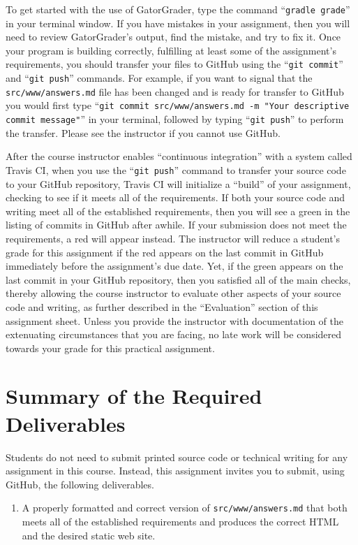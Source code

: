 \documentclass[11pt]{article}
\newcommand{\mainprogramsource}{\lstinline{src/www/answers.md}}
\newcommand{\gatorgraderstart}{\command{gradle grade}}
\newcommand{\gitcommit}{\command{git commit}}
\newcommand{\gitpush}{\command{git push}}
\newcommand{\gitcommitmainprogram}{\command{git commit src/www/answers.md -m "Your
descriptive commit message"}}
\newcommand{\command}[1]{``\lstinline{#1}''}
\newcommand{\step}[1]{``{#1}''}
\newcommand{\checkmark}{\ding{51}}
\newcommand{\naughtmark}{\ding{55}}
\begin{document}
To get started with the use of GatorGrader, type the command
\gatorgraderstart{} in your terminal window. If you have mistakes in your
assignment, then you will need to review GatorGrader's output, find the
mistake, and try to fix it. Once your program is building correctly, fulfilling
at least some of the assignment's requirements, you should transfer your files
to GitHub using the \gitcommit{} and \gitpush{} commands. For example, if you
want to signal that the \mainprogramsource{} file has been changed and is ready
for transfer to GitHub you would first type \gitcommitmainprogram{} in your
terminal, followed by typing \gitpush{} to perform the transfer. Please see the
instructor if you cannot use GitHub.

After the course instructor enables \step{continuous integration} with a system
called Travis CI, when you use the \gitpush{} command to transfer your source
code to your GitHub repository, Travis CI will initialize a \step{build} of your
assignment, checking to see if it meets all of the requirements. If both your
source code and writing meet all of the established requirements, then you will
see a green \checkmark{} in the listing of commits in GitHub after awhile. If
your submission does not meet the requirements, a red \naughtmark{} will appear
instead. The instructor will reduce a student's grade for this assignment if the
red \naughtmark{} appears on the last commit in GitHub immediately before the
assignment's due date. Yet, if the green \checkmark{} appears on the last commit
in your GitHub repository, then you satisfied all of the main checks, thereby
allowing the course instructor to evaluate other aspects of your source code and
writing, as further described in the \step{Evaluation} section of this
assignment sheet. Unless you provide the instructor with documentation of the
extenuating circumstances that you are facing, no late work will be considered
towards your grade for this practical assignment.

\section*{Summary of the Required Deliverables}

\noindent Students do not need to submit printed source code or technical
writing for any assignment in this course. Instead, this assignment invites you
to submit, using GitHub, the following deliverables.

\begin{enumerate}

\setlength{\itemsep}{0in}

\item A properly formatted and correct version of \mainprogramsource{} that both
  meets all of the established requirements and produces the correct HTML and
  the desired static web site.

\end{enumerate}
\end{document}
